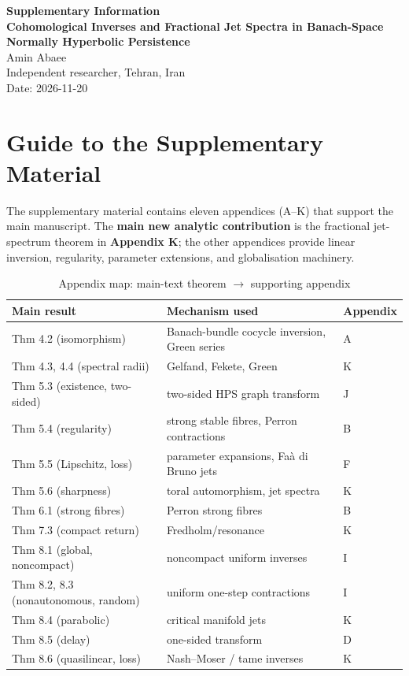 \documentclass[12pt,a4paper]{article}
\theoremstyle{plain}
\numberwithin{equation}{section}
\numberwithin{theorem}{section}
\begin{document}
\begin{center}
{\LARGE \bfseries Supplementary Information} \\[1em]
{\Large \bfseries Cohomological Inverses and Fractional Jet Spectra in Banach-Space Normally Hyperbolic Persistence} \\[2em]
{\small Amin Abaee} \\[0.5em]
{\small Independent researcher, Tehran, Iran} \\
{\small Date: 2026-11-20}
\end{center}

\vspace{1.5em}

\section*{Guide to the Supplementary Material}

The supplementary material contains eleven appendices (A--K) that support the main manuscript. 
The \textbf{main new analytic contribution} is the fractional jet-spectrum theorem in \textbf{Appendix K}; 
the other appendices provide linear inversion, regularity, parameter extensions, and globalisation machinery.

\begin{table}[h]
\centering
\caption{Appendix map: main-text theorem $\to$ supporting appendix}
\label{tab:supp-map-tex}
\begin{tabular}{@{}lll@{}}
\toprule
\textbf{Main result} & \textbf{Mechanism used} & \textbf{Appendix} \\
\midrule
Thm 4.2 (isomorphism) & Banach-bundle cocycle inversion, Green series & A \\
Thm 4.3, 4.4 (spectral radii) & Gelfand, Fekete, Green & K \\
Thm 5.3 (existence, two-sided) & two-sided HPS graph transform & J \\
Thm 5.4 (regularity) & strong stable fibres, Perron contractions & B \\
Thm 5.5 (Lipschitz, loss) & parameter expansions, Fa\`a di Bruno jets & F \\
Thm 5.6 (sharpness) & toral automorphism, jet spectra & K \\
Thm 6.1 (strong fibres) & Perron strong fibres & B \\
Thm 7.3 (compact return) & Fredholm/resonance & K \\
Thm 8.1 (global, noncompact) & noncompact uniform inverses & I \\
Thm 8.2, 8.3 (nonautonomous, random) & uniform one-step contractions & I \\
Thm 8.4 (parabolic) & critical manifold jets & K \\
Thm 8.5 (delay) & one-sided transform & D \\
Thm 8.6 (quasilinear, loss) & Nash--Moser / tame inverses & K \\
\bottomrule
\end{tabular}
\end{table}
\end{document}

